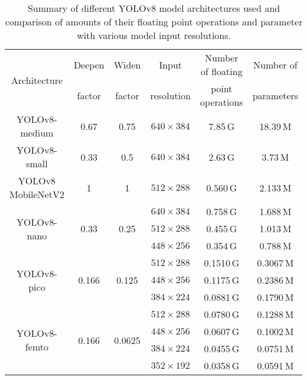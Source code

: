 \begin{table}[h]
\centering
\small
\begin{tabular}{|c|c|c|c|c|c|}
    \hline
    \multirow{2}{*}{Architecture}& Deepen                 & Widen                   & Input      & Number of floating & Number of \\
                                 & factor                 & factor                  & resolution & point operations   & parameters \\
    \hline
    \hline
    YOLOv8-medium                & 0.67                   & 0.75                    & $640 \times 384$ & 7.85\,G & 18.39\,M \\
    \hline
    YOLOv8-small                 & 0.33                   & 0.5                     & $640 \times 384$ & 2.63\,G & 3.73\,M \\
    \hline
    YOLOv8 MobileNetV2           & 1                      & 1                       & $512 \times 288$ & 0.560\,G & 2.133\,M \\
    \hline
    \multirow{3}{*}{YOLOv8-nano} & \multirow{3}{*}{0.33}  & \multirow{3}{*}{0.25}   & $640 \times 384$ & 0.758\,G & 1.688\,M \\
                                 &                        &                         & $512 \times 288$ & 0.455\,G & 1.013\,M \\
                                 &                        &                         & $448 \times 256$ & 0.354\,G & 0.788\,M \\
    \hline
    \multirow{3}{*}{YOLOv8-pico} & \multirow{3}{*}{0.166} & \multirow{3}{*}{0.125}  & $512 \times 288$ & 0.1510\,G & 0.3067\,M \\
                                 &                        &                         & $448 \times 256$ & 0.1175\,G & 0.2386\,M \\
                                 &                        &                         & $384 \times 224$ & 0.0881\,G & 0.1790\,M \\
    \hline
    \multirow{4}{*}{YOLOv8-femto}& \multirow{4}{*}{0.166} & \multirow{4}{*}{0.0625} & $512 \times 288$ & 0.0780\,G & 0.1288\,M \\
                                 &                        &                         & $448 \times 256$ & 0.0607\,G & 0.1002\,M \\
                                 &                        &                         & $384 \times 224$ & 0.0455\,G & 0.0751\,M \\
                                 &                        &                         & $352 \times 192$ & 0.0358\,G & 0.0591\,M \\
    \hline
\end{tabular}
\caption{Summary of different YOLOv8 model architectures used and comparison of amounts of their floating point operations and parameter with various model input resolutions.}
\label{ModelArchitectures}
\end{table}



